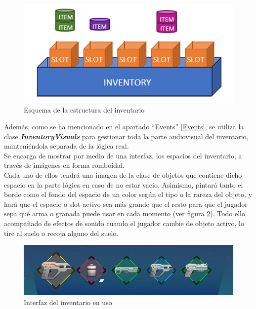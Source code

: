 \begin{figure}[h]
    \centering
    \includegraphics[scale=0.5]{img/InventoryScheme.jpg}
    \caption{Esquema de la estructura del inventario}
    \label{fig:EstrucuraInventario}
    \end{figure}
    
Además, como se ha mencionado en el apartado ``Events'' \ref{Events}, se utiliza la clase \textbf{\textit{InventoryVisuals}} para gestionar toda la parte audiovisual del inventario, manteniéndola separada de la lógica real.\\
Se encarga de mostrar por medio de una interfaz, los espacios del inventario, a través de imágenes en forma romboidal.\\
Cada uno de ellos tendrá una imagen de la clase de objetos que contiene dicho espacio en la parte lógica en caso de no estar vacío. Asimismo, pintará tanto el borde como el fondo del espacio de un color según el tipo o la rareza del objeto, y hará que el espacio o slot activo sea más grande que el resto para que el jugador sepa qué arma o granada puede usar en cada momento (ver figura \ref{fig:InterfazInventario}). Todo ello acompañado de efectos de sonido cuando el jugador cambie de objeto activo, lo tire al suelo o recoja alguno del suelo.

\begin{figure}[h]
    \centering
    \includegraphics[scale=0.55]{img/InventoryInterface.jpg}
    \caption{Interfaz del inventario en uso}
    \label{fig:InterfazInventario}
    \end{figure}
    
